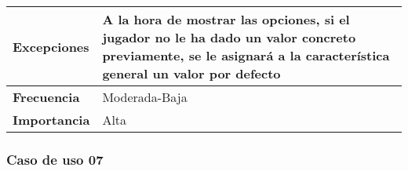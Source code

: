 \begin{tabularx}{\columnwidth}{l|l}
\begin{minipage}{0.25\columnwidth}
\textbf{Excepciones} 
\end{minipage}
&
\begin{minipage}{0.65\columnwidth}
A la hora de mostrar las opciones, si el jugador no le ha dado un valor concreto previamente, se le asignará  a la característica general un valor por defecto
\end{minipage}
\\ \hline

\begin{minipage}{0.25\columnwidth}
\textbf{Frecuencia} 
\end{minipage}
&
\begin{minipage}{0.65\columnwidth}
Moderada-Baja
\end{minipage}
\\ \hline

\begin{minipage}{0.25\columnwidth}
\textbf{Importancia} 
\end{minipage}
&
\begin{minipage}{0.65\columnwidth}
Alta
\end{minipage}
\\ \hline
\end{tabularx}

\subsubsection{Caso de uso 07}

